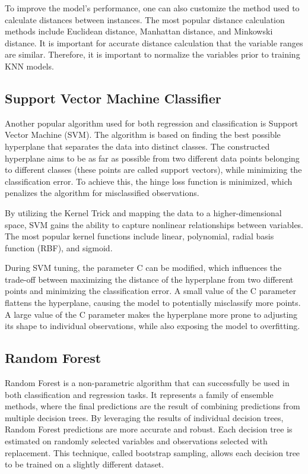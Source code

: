 To improve the model's performance, one can also customize the method used to calculate distances between instances. The most popular distance calculation methods include Euclidean distance, Manhattan distance, and Minkowski distance. It is important for accurate distance calculation that the variable ranges are similar. Therefore, it is important to normalize the variables prior to training KNN models.

\subsection{Support Vector Machine Classifier}
Another popular algorithm used for both regression and classification is Support Vector Machine (SVM). The algorithm is based on finding the best possible hyperplane that separates the data into distinct classes. The constructed hyperplane aims to be as far as possible from two different data points belonging to different classes (these points are called support vectors), while minimizing the classification error. To achieve this, the hinge loss function is minimized, which penalizes the algorithm for misclassified observations.

By utilizing the Kernel Trick and mapping the data to a higher-dimensional space, SVM gains the ability to capture nonlinear relationships between variables. The most popular kernel functions include linear, polynomial, radial basis function (RBF), and sigmoid.

During SVM tuning, the parameter C can be modified, which influences the trade-off between maximizing the distance of the hyperplane from two different points and minimizing the classification error. A small value of the C parameter flattens the hyperplane, causing the model to potentially misclassify more points. A large value of the C parameter makes the hyperplane more prone to adjusting its shape to individual observations, while also exposing the model to overfitting.

\subsection{Random Forest}
Random Forest is a non-parametric algorithm that can successfully be used in both classification and regression tasks. It represents a family of ensemble methods, where the final predictions are the result of combining predictions from multiple decision trees. By leveraging the results of individual decision trees, Random Forest predictions are more accurate and robust. Each decision tree is estimated on randomly selected variables and observations selected with replacement. This technique, called bootstrap sampling, allows each decision tree to be trained on a slightly different dataset.

